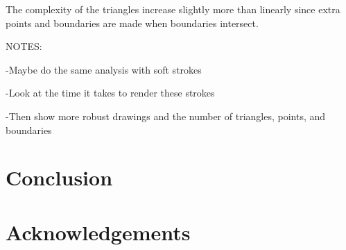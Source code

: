 \documentclass[conference]{acmsiggraph}
\begin{document}

The complexity of the triangles increase slightly more than linearly since extra points and 
boundaries are made when boundaries intersect.

NOTES: 

-Maybe do the same analysis with soft strokes

-Look at the time it takes to render these strokes

-Then show more robust drawings and the number of triangles, points, and boundaries




\section{Conclusion}

\section*{Acknowledgements}



\end{document}
